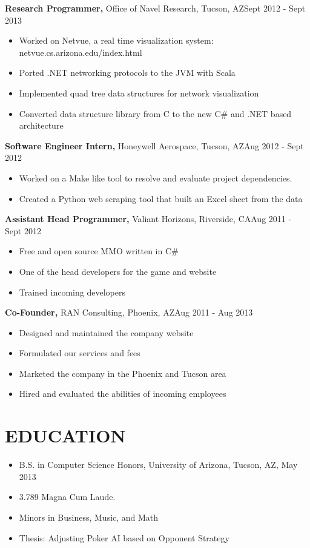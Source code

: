 \documentclass{res}
\begin{document}
\begin{resume}
  {\bf Research Programmer,} Office of Navel Research, Tucson, AZ\hfill Sept 2012 - Sept 2013
  \begin{itemize} \itemsep -2pt %
    \item Worked on Netvue, a real time visualization system: netvue.cs.arizona.edu/index.html
    \item Ported .NET networking protocols to the JVM with Scala
    \item Implemented quad tree data structures for network visualization
    \item Converted data structure library from C to the new C\# and .NET based architecture
  \end{itemize}

  {\bf Software Engineer Intern,} Honeywell Aerospace, Tucson, AZ\hfill Aug 2012 - Sept 2012
  \begin{itemize} \itemsep -2pt %
    \item Worked on a Make like tool to resolve and evaluate project dependencies.
    \item Created a Python web scraping tool that built an Excel sheet from the data
  \end{itemize}

  {\bf Assistant Head Programmer,} Valiant Horizons, Riverside, CA\hfill Aug 2011 - Sept 2012
  \begin{itemize} \itemsep -2pt %
    \item Free and open source MMO written in C\#
    \item One of the head developers for the game and website
    \item Trained incoming developers
  \end{itemize}

  {\bf Co-Founder,} RAN Consulting, Phoenix, AZ\hfill Aug 2011 - Aug 2013
  \begin{itemize} \itemsep -2pt %
    \item Designed and maintained the company website
    \item Formulated our services and fees
    \item Marketed the company in the Phoenix and Tucson area
    \item Hired and evaluated the abilities of incoming employees
  \end{itemize}

\section{EDUCATION} 
  \begin{itemize} \itemsep -2pt %
    \item B.S. in Computer Science Honors, University of Arizona, Tucson, AZ, May 2013
    \item 3.789 Magna Cum Laude. 
    \item Minors in Business, Music, and Math
    \item Thesis: Adjusting Poker AI based on Opponent Strategy
  \end{itemize}


\end{resume}
\end{document}
